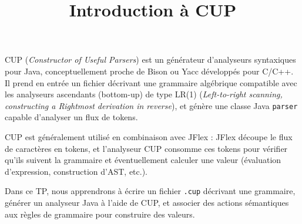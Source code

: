 \documentclass{td}
\title{Introduction à CUP}
\begin{document}
\maketitle

CUP (\emph{Constructor of Useful Parsers}) est un générateur d'analyseurs
syntaxiques pour Java, conceptuellement proche de Bison ou Yacc développés pour C/C++.
Il prend en entrée un fichier décrivant une grammaire algébrique
compatible avec les analyseurs ascendants (bottom-up) de type LR(1)
(\emph{Left-to-right scanning, constructing a Rightmost derivation in reverse}),
et génère une classe Java \texttt{parser} capable d'analyser un flux de tokens.

CUP est généralement utilisé en combinaison avec JFlex : JFlex découpe
le flux de caractères en tokens, et l'analyseur CUP consomme ces tokens
pour vérifier qu'ils suivent la grammaire et éventuellement calculer
une valeur (évaluation d'expression, construction d'AST, etc.).

Dans ce TP, nous apprendrons à écrire un fichier \texttt{.cup} décrivant une grammaire,
générer un analyseur Java à l'aide de CUP,
et associer des actions sémantiques aux règles de grammaire pour construire des valeurs.
\end{document}
